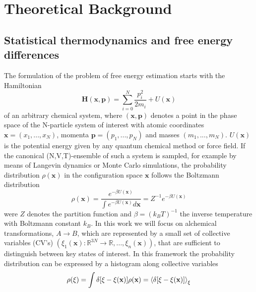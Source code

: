 \chapter{Theoretical Background}
\label{cha:theory}

\section{Statistical thermodynamics and free energy differences}
\label{sec:freeE}

The formulation of the problem of free energy estimation starts with the Hamiltonian
\begin{equation}
  \textbf{H}(\textbf{x},\textbf{p})=\sum_{i=0}^{N}\frac{p_{i}^{ 2}}{2 m_i} + U(\textbf{x})
\end{equation}
of an arbitrary chemical system, where $(\textbf{x},\textbf{p})$ denotes a point in the phase space of the N-particle system of interest with atomic coordinates $\textbf{x}=(x_1, ..., x_N)$, momenta $\textbf{p}=(p_1,...,p_N)$ and masses $(m_1,...,m_N)$. $U(\textbf{x})$ is the potential energy given by any quantum chemical method or force field. If the canonical (N,V,T)-ensemble of such a system is sampled, for example by means of Langevin dynamics or Monte Carlo simulations, the probability distribution $\rho(\textbf{x})$ in the configuration space $\textbf{x}$ follows the Boltzmann distribution
\begin{equation}
  \rho(\textbf{x})=\frac{e^{-\beta U(\textbf{x})}}{\int e^{-\beta U(\textbf{x})} d\textbf{x}}=Z^{-1}e^{-\beta U(\textbf{x})}
  \label{eq:boltzmann}
\end{equation}
were $Z$ denotes the partition function and $\beta=(k_B T)^{-1}$ the inverse temperature with Boltzmann constant $k_B$.
In this work we will focus on alchemical transformations, $A\longrightarrow B$, which are represented by a small set of collective variables (CV's) $(\xi_1(\textbf{x}) : \mathbb{R} ^{3N} \to \mathbb{R}, ..., \xi_n(\textbf{x}))$, that are sufficient to distinguish between key states of interest.
In this framework the probability distribution can be expressed by a histogram along collective variables
\begin{equation}
  \rho(\xi)=\int \delta[\xi-\xi(\textbf{x})]\rho(\textbf{x})=\braket{\delta [\xi -\xi(\textbf{x})]}_\xi
  \label{eq:rho}
\end{equation}

